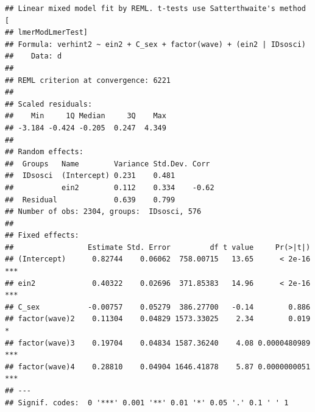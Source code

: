 \documentclass[
]{book}
\newenvironment{Shaded}{\begin{snugshade}}{\end{snugshade}}
\newcommand{\CommentTok}[1]{\textcolor[rgb]{0.56,0.35,0.01}{\textit{#1}}}
\newcommand{\DataTypeTok}[1]{\textcolor[rgb]{0.13,0.29,0.53}{#1}}
\newcommand{\KeywordTok}[1]{\textcolor[rgb]{0.13,0.29,0.53}{\textbf{#1}}}
\newcommand{\NormalTok}[1]{#1}
\newcommand{\OperatorTok}[1]{\textcolor[rgb]{0.81,0.36,0.00}{\textbf{#1}}}
\newcommand{\OtherTok}[1]{\textcolor[rgb]{0.56,0.35,0.01}{#1}}
\newcommand{\StringTok}[1]{\textcolor[rgb]{0.31,0.60,0.02}{#1}}
\begin{document}
\begin{Shaded}
\end{Shaded}

\begin{verbatim}
## Linear mixed model fit by REML. t-tests use Satterthwaite's method [
## lmerModLmerTest]
## Formula: verhint2 ~ ein2 + C_sex + factor(wave) + (ein2 | IDsosci)
##    Data: d
## 
## REML criterion at convergence: 6221
## 
## Scaled residuals: 
##    Min     1Q Median     3Q    Max 
## -3.184 -0.424 -0.205  0.247  4.349 
## 
## Random effects:
##  Groups   Name        Variance Std.Dev. Corr 
##  IDsosci  (Intercept) 0.231    0.481         
##           ein2        0.112    0.334    -0.62
##  Residual             0.639    0.799         
## Number of obs: 2304, groups:  IDsosci, 576
## 
## Fixed effects:
##                 Estimate Std. Error         df t value     Pr(>|t|)    
## (Intercept)      0.82744    0.06062  758.00715   13.65      < 2e-16 ***
## ein2             0.40322    0.02696  371.85383   14.96      < 2e-16 ***
## C_sex           -0.00757    0.05279  386.27700   -0.14        0.886    
## factor(wave)2    0.11304    0.04829 1573.33025    2.34        0.019 *  
## factor(wave)3    0.19704    0.04834 1587.36240    4.08 0.0000480989 ***
## factor(wave)4    0.28810    0.04904 1646.41878    5.87 0.0000000051 ***
## ---
## Signif. codes:  0 '***' 0.001 '**' 0.01 '*' 0.05 '.' 0.1 ' ' 1
\end{verbatim}
\end{document}

